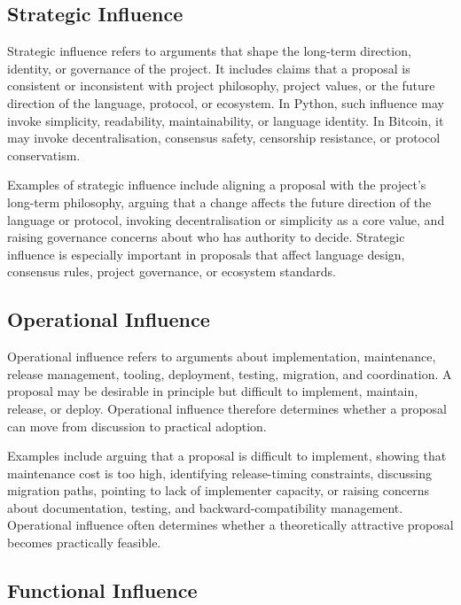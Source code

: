 \subsection{Strategic Influence}

Strategic influence refers to arguments that shape the long-term direction, identity, or governance of the project. It includes claims that a proposal is consistent or inconsistent with project philosophy, project values, or the future direction of the language, protocol, or ecosystem. In Python, such influence may invoke simplicity, readability, maintainability, or language identity. In Bitcoin, it may invoke decentralisation, consensus safety, censorship resistance, or protocol conservatism.

Examples of strategic influence include aligning a proposal with the project's long-term philosophy, arguing that a change affects the future direction of the language or protocol, invoking decentralisation or simplicity as a core value, and raising governance concerns about who has authority to decide. Strategic influence is especially important in proposals that affect language design, consensus rules, project governance, or ecosystem standards.

\subsection{Operational Influence}

Operational influence refers to arguments about implementation, maintenance, release management, tooling, deployment, testing, migration, and coordination. A proposal may be desirable in principle but difficult to implement, maintain, release, or deploy. Operational influence therefore determines whether a proposal can move from discussion to practical adoption.

Examples include arguing that a proposal is difficult to implement, showing that maintenance cost is too high, identifying release-timing constraints, discussing migration paths, pointing to lack of implementer capacity, or raising concerns about documentation, testing, and backward-compatibility management. Operational influence often determines whether a theoretically attractive proposal becomes practically feasible.

\subsection{Functional Influence}

